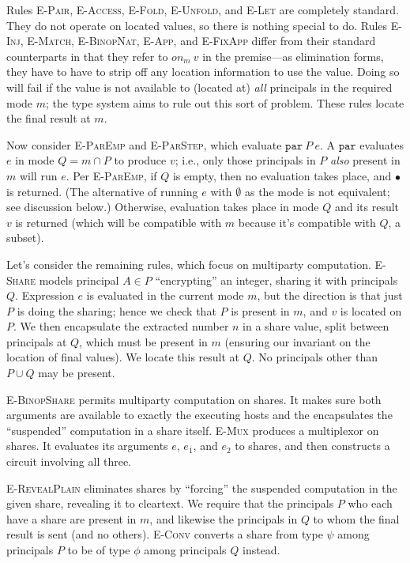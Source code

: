 \documentclass[10pt]{article}
\newcommand{\rulelab}[1]{{\small \textsc{#1}}}
\newcommand{\kw}[1]{\ensuremath{\mathtt{#1}}}
\newcommand{\epar}[2]{\ensuremath{\kw{par}~{#1}~{#2}}}
\newcommand{\vcrash}{\ensuremath{\bullet}}
\newcommand{\getat}[2]{\ensuremath{\mathit{on}_{#1}~{#2}}}
\begin{document}
Rules \rulelab{E-Pair}, \rulelab{E-Access}, \rulelab{E-Fold},
\rulelab{E-Unfold}, and \rulelab{E-Let} are completely standard. They
do not operate on located values, so there is nothing special to do.
Rules \rulelab{E-Inj}, \rulelab{E-Match}, \rulelab{E-BinopNat},
\rulelab{E-App}, and \rulelab{E-FixApp} differ from their standard
counterparts in that they refer to $\getat{m}{v}$ in the premise---as
elimination forms, they have to have to strip off any location
information to use the value. Doing so will fail if the value is
not available to (located at) \emph{all} principals in the required
mode $m$; the type system aims to rule out this sort of problem. These
rules locate the final result at $m$.

Now consider \rulelab{E-ParEmp} and \rulelab{E-ParStep}, which
evaluate $\epar{P}{e}$. A $\kw{par}$ evaluates $e$ in mode
$Q = m \cap P$ to produce $v$; i.e., only those principals in $P$
\emph{also} present in $m$ will run $e$. Per \rulelab{E-ParEmp}, if
$Q$ is empty, then no evaluation takes place, and $\vcrash$ is
returned. (The alternative of running $e$ with $\emptyset$ as the
mode is not equivalent; see discussion below.)  Otherwise, evaluation
takes place in mode $Q$ and its result $v$ is returned (which will be
compatible with $m$ because it's compatible with $Q$, a subset).

Let's consider the remaining rules, which focus on multiparty
computation. \rulelab{E-Share} models principal $A \in P$
``encrypting'' an integer, sharing it with principals $Q$. Expression
$e$ is evaluated in the current mode $m$, but the direction is that
just $P$ is doing the sharing; hence we check that $P$ is present in
$m$, and $v$ is located
on $P$. We then encapsulate the extracted number $n$ in a share value,
split between principals at $Q$, which must be present in $m$
(ensuring our invariant on the location of final values). We locate
this result at $Q$. No principals other than $P \cup Q$ may be
present. 

\rulelab{E-BinopShare} permits multiparty computation on shares. It
makes sure both arguments are available to exactly the executing hosts
and the encapsulates the ``suspended'' computation in a share
itself. \rulelab{E-Mux} produces a multiplexor on shares. It evaluates
its arguments $e$, $e_1$, and $e_2$ to shares, and then constructs a
circuit involving all three.

\rulelab{E-RevealPlain} eliminates shares by ``forcing'' the suspended
computation in the given share, revealing it to cleartext. We require
that the principals $P$ who each have a share are present in $m$, and
likewise the principals in $Q$ to whom the final result is sent (and
no others). \rulelab{E-Conv} converts a share from type $\psi$ among
principals $P$ to be of type $\phi$ among principals $Q$ instead.
\end{document}
